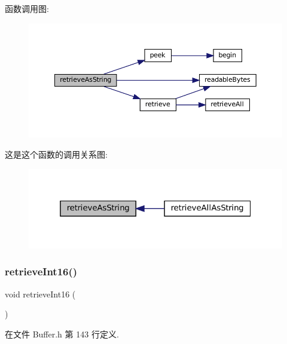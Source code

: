 函数调用图\+:
\nopagebreak
\begin{figure}[H]
\begin{center}
\leavevmode
\includegraphics[width=350pt]{classmuduo_1_1net_1_1Buffer_a2f372acde2975d2cd9a7633148db7e7f_cgraph}
\end{center}
\end{figure}
这是这个函数的调用关系图\+:
\nopagebreak
\begin{figure}[H]
\begin{center}
\leavevmode
\includegraphics[width=319pt]{classmuduo_1_1net_1_1Buffer_a2f372acde2975d2cd9a7633148db7e7f_icgraph}
\end{center}
\end{figure}
\mbox{\label{classmuduo_1_1net_1_1Buffer_a78a272f407b370f1a5e0d30d0bdcf131}} 
\subsubsection{\texorpdfstring{retrieve\+Int16()}{retrieveInt16()}}
{\footnotesize\ttfamily void retrieve\+Int16 (\begin{DoxyParamCaption}{ }\end{DoxyParamCaption})\hspace{0.3cm}{\ttfamily [inline]}}



在文件 Buffer.\+h 第 143 行定义.



